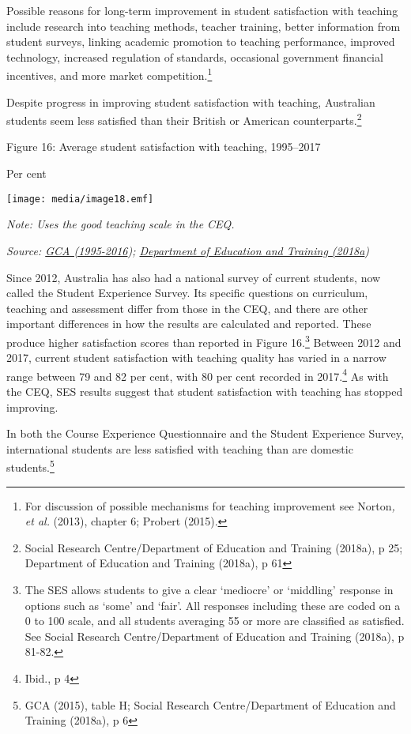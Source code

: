 \documentclass[]{book}
\begin{document}
Possible reasons for long-term improvement in student satisfaction with teaching include research into teaching methods, teacher training, better information from student surveys, linking academic promotion to teaching performance, improved technology, increased regulation of standards, occasional government financial incentives, and more market competition.\footnote{For discussion of possible mechanisms for teaching improvement see Norton\emph{, et al.} (2013), chapter 6; Probert (2015).}

Despite progress in improving student satisfaction with teaching, Australian students seem less satisfied than their British or American counterparts.\footnote{Social Research Centre/Department of Education and Training (2018a), p 25; Department of Education and Training (2018a), p 61}

\protect\hypertarget{_Ref520364329}{}{}Figure 16: Average student satisfaction with teaching, 1995--2017

Per cent

\texttt{[image: media/image18.emf]}

\emph{Note: Uses the good teaching scale in the CEQ.}

\emph{Source: \protect\hyperlink{_ENREF_117}{GCA (1995-2016}); \protect\hyperlink{_ENREF_80}{Department of Education and Training (2018a})}

Since 2012, Australia has also had a national survey of current students, now called the Student Experience Survey. Its specific questions on curriculum, teaching and assessment differ from those in the CEQ, and there are other important differences in how the results are calculated and reported. These produce higher satisfaction scores than reported in Figure 16.\footnote{The SES allows students to give a clear `mediocre' or `middling' response in options such as `some' and `fair'. All responses including these are coded on a 0 to 100 scale, and all students averaging 55 or more are classified as satisfied. See Social Research Centre/Department of Education and Training (2018a), p 81-82.} Between 2012 and 2017, current student satisfaction with teaching quality has varied in a narrow range between 79 and 82 per cent, with 80 per cent recorded in 2017.\footnote{Ibid., p 4} As with the CEQ, SES results suggest that student satisfaction with teaching has stopped improving.

In both the Course Experience Questionnaire and the Student Experience Survey, international students are less satisfied with teaching than are domestic students.\footnote{GCA (2015), table H; Social Research Centre/Department of Education and Training (2018a), p 6}
\end{document}
